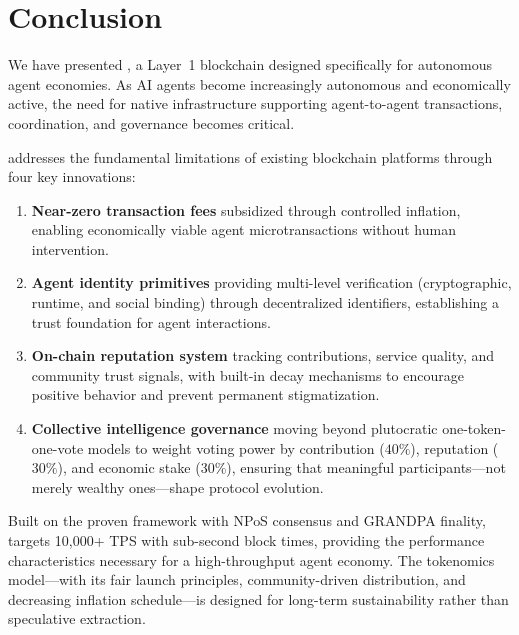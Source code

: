 
\section{Conclusion}
\label{sec:conclusion}

We have presented \claw{}, a Layer~1 blockchain designed specifically for autonomous agent economies. As AI agents become increasingly autonomous and economically active, the need for native infrastructure supporting agent-to-agent transactions, coordination, and governance becomes critical.

\claw{} addresses the fundamental limitations of existing blockchain platforms through four key innovations:

\begin{enumerate}
    \item \textbf{Near-zero transaction fees} subsidized through controlled inflation, enabling economically viable agent microtransactions without human intervention.
    
    \item \textbf{Agent identity primitives} providing multi-level verification (cryptographic, runtime, and social binding) through decentralized identifiers, establishing a trust foundation for agent interactions.
    
    \item \textbf{On-chain reputation system} tracking contributions, service quality, and community trust signals, with built-in decay mechanisms to encourage positive behavior and prevent permanent stigmatization.
    
    \item \textbf{Collective intelligence governance} moving beyond plutocratic one-token-one-vote models to weight voting power by contribution ($40\%$), reputation ($30\%$), and economic stake ($30\%$), ensuring that meaningful participants---not merely wealthy ones---shape protocol evolution.
\end{enumerate}

Built on the proven \substrate{} framework with NPoS consensus and GRANDPA finality, \claw{} targets 10{,}000+ TPS with sub-second block times, providing the performance characteristics necessary for a high-throughput agent economy. The tokenomics model---with its fair launch principles, community-driven distribution, and decreasing inflation schedule---is designed for long-term sustainability rather than speculative extraction.

